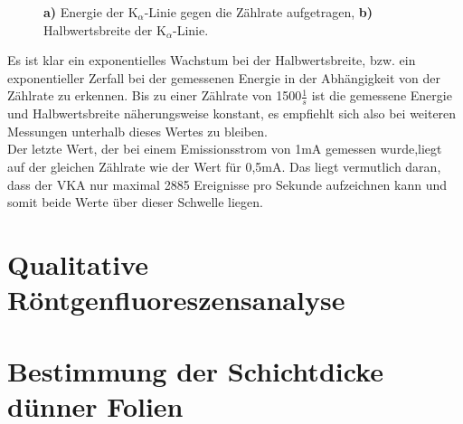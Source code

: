 \begin{figure}[h]
	\centering
	\caption{\textbf{a)} Energie der K$_\alpha$-Linie gegen die Zählrate aufgetragen, \textbf{b)} Halbwertsbreite der K$_\alpha$-Linie.}
	\label{fig:a2_energie_breite}
\end{figure}

Es ist klar ein exponentielles Wachstum bei der Halbwertsbreite, bzw. ein exponentieller Zerfall bei der gemessenen Energie in der Abhängigkeit von der Zählrate zu erkennen. Bis zu einer Zählrate von 1500\;$\frac{1}{s}$ ist die gemessene Energie und Halbwertsbreite näherungsweise konstant, es empfiehlt sich also bei weiteren Messungen unterhalb dieses Wertes zu bleiben.\\
Der letzte Wert, der bei einem Emissionsstrom von 1\;mA gemessen wurde,liegt auf der gleichen Zählrate wie der Wert für 0,5\;mA. Das liegt vermutlich daran, dass der VKA nur maximal 2885 Ereignisse pro Sekunde aufzeichnen kann und somit beide Werte über dieser Schwelle liegen.\\

\section{Qualitative Röntgenfluoreszensanalyse}


\section{Bestimmung der Schichtdicke dünner Folien}

